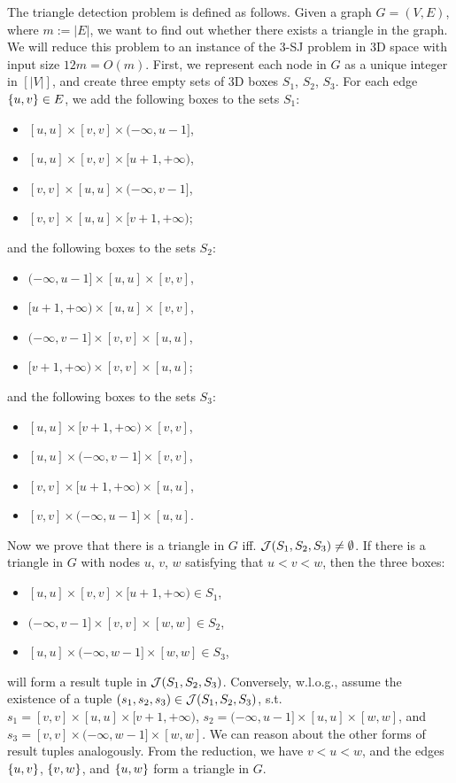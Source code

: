 The triangle detection problem is defined as follows. Given a graph $G = (V,E)$, where $m:=|E|$, we want to find out whether there exists a triangle in the graph. We will reduce this problem to an instance of the 3-SJ problem in 3D space with input size $12m=O(m)$. First, we represent each node in $G$ as a unique integer in $[|V|]$, and create three empty sets of 3D boxes $S_1$, $S_2$, $S_3$. For each edge $\{u,v\}\in E$, we add the following boxes to the sets $S_1$:
\begin{itemize}
    \item $[u,u]\times [v,v]\times(-\infty,u-1]$,
    \item $[u,u]\times [v,v]\times[u+1,+\infty)$,
    \item $[v,v]\times [u,u] \times (-\infty,v-1]$,
    \item $[v,v]\times [u,u] \times [v+1,+\infty)$;
\end{itemize}
and the following boxes to the sets $S_2$:
\begin{itemize}
    \item $(-\infty,u-1]\times[u,u]\times [v,v]$,
    \item $[u+1,+\infty)\times[u,u]\times [v,v]$,
    \item $(-\infty,v-1] \times[v,v]\times [u,u]$,
    \item $ [v+1,+\infty)\times [v,v]\times [u,u]$;
\end{itemize}
and the following boxes to the sets $S_3$:
\begin{itemize}
    \item $[u,u]\times[v+1,+\infty)\times [v,v]$,
    \item $[u,u]\times(-\infty,v-1]\times [v,v]$,
    \item $[v,v]\times[u+1,+\infty)\times [u,u]$,
    \item $[v,v]\times(-\infty,u-1]\times [u,u]$.
\end{itemize}
Now we prove that there is a triangle in $G$ iff.
 $\mathcal{J}(S_1,S_2,S_3) \neq \emptyset$. If there is a triangle in $G$ with nodes $u$, $v$, $w$ satisfying that $u < v < w$, then the three boxes:
\begin{itemize}
    \item $[u,u]\times [v,v]\times[u+1, +\infty)\in S_1$,
    \item $(-\infty,v-1]\times[v,v]\times [w,w] \in S_2$,
    \item $[u,u]\times(-\infty, w-1]\times [w,w] \in S_3$,
\end{itemize}
will form a result tuple in $\mathcal{J}(S_1,S_2,S_3)$. Conversely, w.l.o.g., assume the existence of a tuple $(s_1,s_2,s_3)\in \mathcal{J}(S_1,S_2,S_3)$, s.t. $s_1 = [v,v]\times [u,u]\times[v+1, +\infty)$, $s_2 = (-\infty,u-1]\times[u,u]\times [w,w]$, and $s_3 = [v,v]\times(-\infty, w-1]\times [w,w]$. We can reason about the other forms of result tuples analogously. From the reduction, we have $v< u< w$, and the edges $\{u,v\}$, $\{v,w\}$, and $\{u,w\}$ form a triangle in $G$. 
